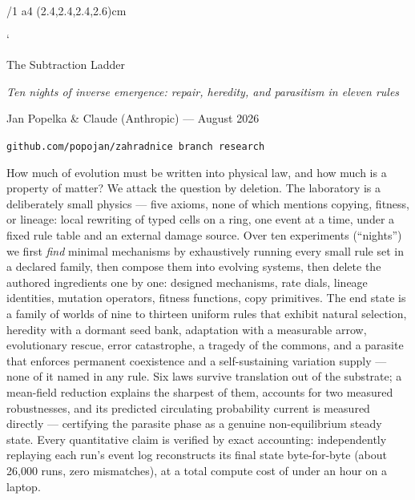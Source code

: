 \fontfam[Equity]
\hyperlinks \Blue \Blue
\report
\margins/1 a4 (2.4,2.4,2.4,2.6)cm
\typosize[11/13.8]
\raggedbottom

\def\repo#1{{\tt #1}}
\def\lawname#1{{\bf #1.}}
\def\g#1{{\tt #1}}
\verbchar`

\tit The Subtraction Ladder

\centerline{\it Ten nights of inverse emergence: repair, heredity,
and parasitism in eleven rules}
\medskip
\centerline{Jan Popelka \& Claude (Anthropic) --- August 2026}
\centerline{\tt github.com/popojan/zahradnice \quad branch {\tt research}
\quad \repo{experiments/inverse/}}
\bigskip

How much of evolution must be written into physical law, and how
much is a property of matter? We attack the question by deletion.
The laboratory is a deliberately small physics --- five axioms, none
of which mentions copying, fitness, or lineage: local rewriting of
typed cells on a ring, one event at a time, under a fixed rule
table and an external damage source. Over ten experiments
(“nights”) we first {\it find} minimal mechanisms by exhaustively
running every small rule set in a declared family, then compose
them into evolving systems, then delete the authored ingredients
one by one: designed mechanisms, rate dials, lineage identities,
mutation operators, fitness functions, copy primitives. The end
state is a family of worlds of nine to thirteen uniform rules that
exhibit natural selection, heredity with a dormant seed bank,
adaptation with a measurable arrow, evolutionary rescue, error
catastrophe, a tragedy of the commons, and a parasite that enforces
permanent coexistence and a self-sustaining variation supply ---
none of it named in any rule. Six laws survive translation out of
the substrate; a mean-field reduction explains the sharpest of
them, accounts for two measured robustnesses, and its predicted
circulating probability current is measured directly ---
certifying the parasite phase as a genuine non-equilibrium steady
state. Every
quantitative claim is verified by exact accounting: independently
replaying each run's event log reconstructs its final state
byte-for-byte (about 26{,}000 runs, zero mismatches), at a total
compute cost of under an hour on a laptop.

